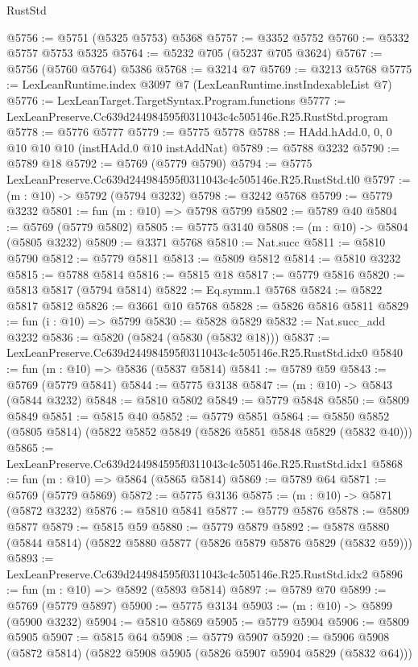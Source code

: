 \begin{lexlean}{RustStd}
\begin{coremodule}
@5756 := @5751 (@5325 @5753) @5368
@5757 := @3352 @5752
@5760 := @5332 @5757 @5753 @5325
@5764 := @5232 @705 (@5237 @705 @3624)
@5767 := @5756 (@5760 @5764) @5386
@5768 := @3214 @7
@5769 := @3213 @5768
@5775 := LexLeanRuntime.index @3097 @7 (LexLeanRuntime.instIndexableList @7)
@5776 := LexLeanTarget.TargetSyntax.Program.functions
@5777 := LexLeanPreserve.Cc639d244984595f0311043c4c505146e.R25.RustStd.program
@5778 := @5776 @5777
@5779 := @5775 @5778
@5788 := HAdd.hAdd.{0, 0, 0} @10 @10 @10 (instHAdd.{0} @10 instAddNat)
@5789 := @5788 @3232
@5790 := @5789 @18
@5792 := @5769 (@5779 @5790)
@5794 := @5775 LexLeanPreserve.Cc639d244984595f0311043c4c505146e.R25.RustStd.tl0
@5797 := (m : @10) -> @5792 (@5794 @3232)
@5798 := @3242 @5768
@5799 := @5779 @3232
@5801 := fun (m : @10) => @5798 @5799
@5802 := @5789 @40
@5804 := @5769 (@5779 @5802)
@5805 := @5775 @3140
@5808 := (m : @10) -> @5804 (@5805 @3232)
@5809 := @3371 @5768
@5810 := Nat.succ
@5811 := @5810 @5790
@5812 := @5779 @5811
@5813 := @5809 @5812
@5814 := @5810 @3232
@5815 := @5788 @5814
@5816 := @5815 @18
@5817 := @5779 @5816
@5820 := @5813 @5817 (@5794 @5814)
@5822 := Eq.symm.{1} @5768
@5824 := @5822 @5817 @5812
@5826 := @3661 @10 @5768
@5828 := @5826 @5816 @5811
@5829 := fun (i : @10) => @5799
@5830 := @5828 @5829
@5832 := Nat.succ_add @3232
@5836 := @5820 (@5824 (@5830 (@5832 @18)))
@5837 := LexLeanPreserve.Cc639d244984595f0311043c4c505146e.R25.RustStd.idx0
@5840 := fun (m : @10) => @5836 (@5837 @5814)
@5841 := @5789 @59
@5843 := @5769 (@5779 @5841)
@5844 := @5775 @3138
@5847 := (m : @10) -> @5843 (@5844 @3232)
@5848 := @5810 @5802
@5849 := @5779 @5848
@5850 := @5809 @5849
@5851 := @5815 @40
@5852 := @5779 @5851
@5864 := @5850 @5852 (@5805 @5814) (@5822 @5852 @5849 (@5826 @5851 @5848 @5829 (@5832 @40)))
@5865 := LexLeanPreserve.Cc639d244984595f0311043c4c505146e.R25.RustStd.idx1
@5868 := fun (m : @10) => @5864 (@5865 @5814)
@5869 := @5789 @64
@5871 := @5769 (@5779 @5869)
@5872 := @5775 @3136
@5875 := (m : @10) -> @5871 (@5872 @3232)
@5876 := @5810 @5841
@5877 := @5779 @5876
@5878 := @5809 @5877
@5879 := @5815 @59
@5880 := @5779 @5879
@5892 := @5878 @5880 (@5844 @5814) (@5822 @5880 @5877 (@5826 @5879 @5876 @5829 (@5832 @59)))
@5893 := LexLeanPreserve.Cc639d244984595f0311043c4c505146e.R25.RustStd.idx2
@5896 := fun (m : @10) => @5892 (@5893 @5814)
@5897 := @5789 @70
@5899 := @5769 (@5779 @5897)
@5900 := @5775 @3134
@5903 := (m : @10) -> @5899 (@5900 @3232)
@5904 := @5810 @5869
@5905 := @5779 @5904
@5906 := @5809 @5905
@5907 := @5815 @64
@5908 := @5779 @5907
@5920 := @5906 @5908 (@5872 @5814) (@5822 @5908 @5905 (@5826 @5907 @5904 @5829 (@5832 @64)))

\end{coremodule}
\end{lexlean}

